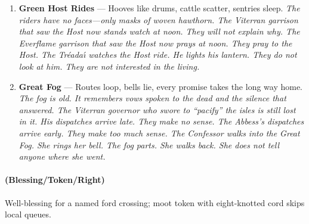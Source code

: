 \begin{enumerate}
\item[K] \textbf{Green Host Rides} --- Hooves like drums, cattle scatter, sentries sleep.
  \hfill \textit{The riders have no faces---only masks of woven hawthorn. The Viterran garrison that saw the Host now stands watch at noon. They will not explain why. The Everflame garrison that saw the Host now prays at noon. They pray to the Host. The Tr\'eada\'{\i} watches the Host ride. He lights his lantern. They do not look at him. They are not interested in the living.}
\item[A] \textbf{Great Fog} --- Routes loop, bells lie, every promise takes the long way home.
  \hfill \textit{The fog is old. It remembers vows spoken to the dead and the silence that answered. The Viterran governor who swore to ``pacify'' the isles is still lost in it. His dispatches arrive late. They make no sense. The Abbess's dispatches arrive early. They make too much sense. The Confessor walks into the Great Fog. She rings her bell. The fog parts. She walks back. She does not tell anyone where she went.}
\end{enumerate}

\paragraph*{(Blessing/Token/Right)} Well-blessing for a named ford crossing; moot token with eight-knotted cord skips local queues.

